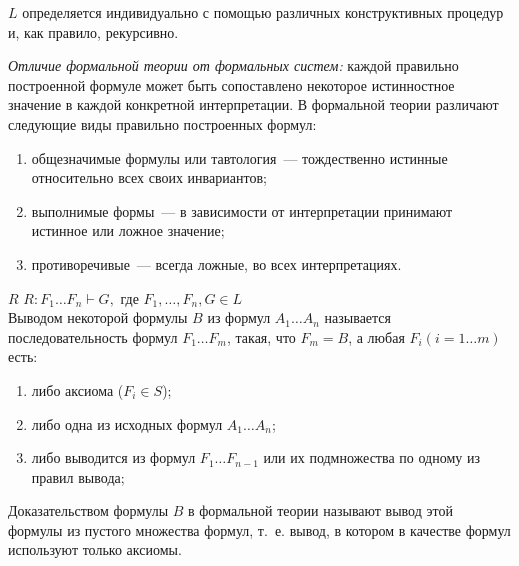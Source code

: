 \documentclass[a4paper,12pt]{report}
\begin{document}
	$ L $ определяется индивидуально с помощью различных конструктивных
	процедур и, как правило, рекурсивно.

	\textit{Отличие формальной теории от формальных систем:} каждой правильно
	построенной формуле может быть сопоставлено некоторое истинностное значение в
	каждой конкретной интерпретации. В формальной теории различают следующие виды
	правильно построенных формул:
	\begin{enumerate}
		\item общезначимые формулы или тавтология~--- тождественно истинные
			относительно всех своих инвариантов;
		\item выполнимые формы~--- в зависимости от интерпретации принимают
			истинное или ложное значение;
		\item противоречивые~--- всегда ложные, во всех интерпретациях.\\
	\end{enumerate}

	$ R $ $ \textit{R}: F_1 \dots F_n \vdash G, $ где $ F_1, \dots, F_n,
	G \in L $\\
	Выводом некоторой формулы $ B $ из формул $ A_1 \dots A_n $ называется
	последовательность формул $ F_1 \dots F_m $, такая, что $ F_m = B $, а любая
	$ F_i (i = 1 \dots m) $ есть:
	\begin{enumerate}
		\item либо аксиома ($ F_i \in S $);
		\item либо одна из исходных формул $ A_1 \dots A_n $;
		\item либо выводится из формул $ F_1 \dots F_{n-1} $ или их подмножества по
			одному из правил вывода;
	\end{enumerate}

	Доказательством формулы $ B $ в формальной теории называют вывод этой формулы
	из пустого множества формул, т.~е. вывод, в котором в качестве формул
	используют только аксиомы.
\end{document}
